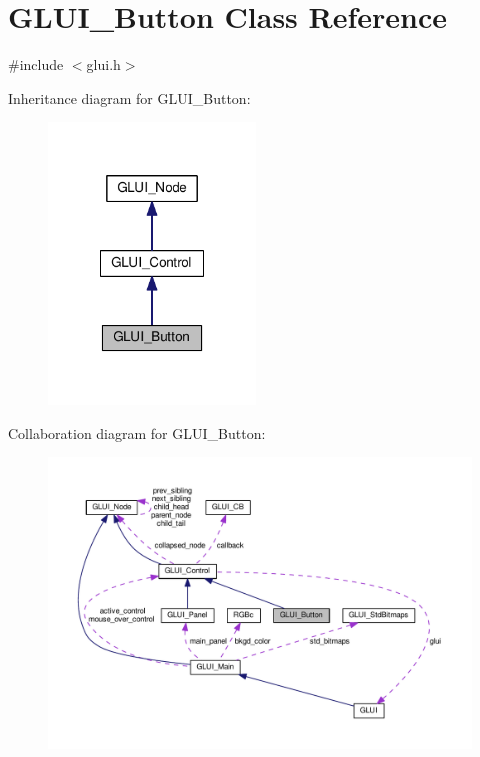 \hypertarget{class_g_l_u_i___button}{\section{G\+L\+U\+I\+\_\+\+Button Class Reference}
\label{class_g_l_u_i___button}
}


{\ttfamily \#include $<$glui.\+h$>$}



Inheritance diagram for G\+L\+U\+I\+\_\+\+Button\+:\nopagebreak
\begin{figure}[H]
\begin{center}
\leavevmode
\includegraphics[width=156pt]{class_g_l_u_i___button__inherit__graph}
\end{center}
\end{figure}


Collaboration diagram for G\+L\+U\+I\+\_\+\+Button\+:\nopagebreak
\begin{figure}[H]
\begin{center}
\leavevmode
\includegraphics[width=350pt]{class_g_l_u_i___button__coll__graph}
\end{center}
\end{figure}
